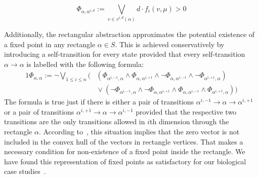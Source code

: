 \documentclass{llncs}
\begin{document}
%
%
%


\begin{equation*}\Phi_{\alpha,\alpha^{i,d}} :=
	\bigvee_{v \in v^{i,d}(\alpha)} d \cdot f_i(v,\mu) > 0
\label{eq:transition1}
\end{equation*}

Additionally, the rectangular abstraction approximates the potential existence of a fixed point in any rectangle $\alpha\in S$. This is achieved conservatively by introducing a self-transition for every state provided that every self-transition $\alpha\rightarrow\alpha$ is labelled with the following formula: 
\begin{alignat*}{1}
\Phi_{\alpha, \alpha} := 
	\neg \textstyle\bigvee_{1 \le i \le n} \bigl(&
		(\Phi_{\alpha^{i,-1},\alpha}
		\wedge \Phi_{\alpha,\alpha^{i,+1}}
		\wedge \neg \Phi_{\alpha,\alpha^{i,-1}}
		\wedge \neg \Phi_{\alpha^{i,+1},\alpha})\\[-2mm]
&{} \vee
(\neg\Phi_{\alpha^{i,-1},\alpha}
		\wedge \neg\Phi_{\alpha,\alpha^{i,+1}}
		\wedge \Phi_{\alpha,\alpha^{i,-1}}
		\wedge \Phi_{\alpha^{i,+1},\alpha})
\bigr)
\end{alignat*}
The formula is true just if there is either a pair of transitions $\alpha^{i,-1}\rightarrow\alpha\rightarrow\alpha^{i,+1}$ or a pair of transitions $\alpha^{i,+1}\rightarrow\alpha\rightarrow\alpha^{i,-1}$ provided that the respective two transitions are the only transitions allowed in $i$th dimension through the rectangle $\alpha$. According to~\cite{BYW+07}, this situation implies that the zero vector is not included in the convex hull of the vectors in rectangle vertices. That makes a necessary condition for non-existence of a fixed point inside the rectangle. We have found this representation of fixed points as satisfactory for our biological case studies~\cite{CMSB15,TCBB}. %
\end{document}
